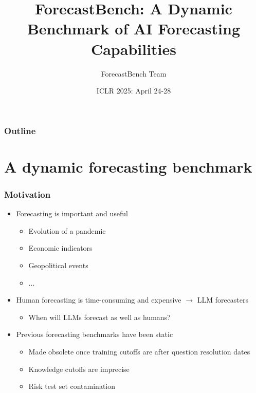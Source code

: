 \documentclass[aspectratio=169]{beamer}
\title[ForecastBench]{ForecastBench: A Dynamic Benchmark of AI Forecasting Capabilities}
\author[Forecasting Research Institute]{ForecastBench Team}
\institute[]{\pgfuseimage{logo}}
\date[ICLR 2025]{ICLR 2025: April 24-28}
\begin{document}
\begin{frame}
  \titlepage
\end{frame}

\begin{frame}
  \frametitle{Outline}
  \tableofcontents
\end{frame}

\section{A dynamic forecasting benchmark}

\begin{frame}
  \frametitle{Motivation}
  \begin{itemize}
  \item Forecasting is important and useful
    \begin{itemize}
    \item Evolution of a pandemic
    \item Economic indicators
    \item Geopolitical events
    \item ...
    \end{itemize}
  \item Human forecasting is time-consuming and expensive $\rightarrow$ LLM forecasters
    \begin{itemize}
    \item When will LLMs forecast as well as humans?
    \end{itemize}
  \item Previous forecasting benchmarks have been static
    \begin{itemize}
    \item Made obsolete once training cutoffs are after question resolution dates
    \item Knowledge cutoffs are imprecise
    \item Risk test set contamination
    \end{itemize}
  \end{itemize}
\end{frame}
\end{document}
